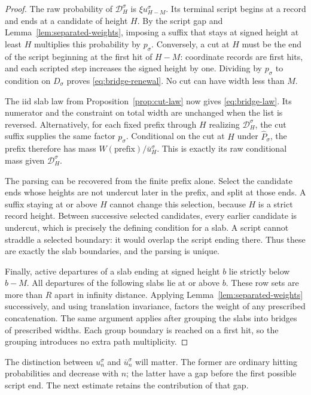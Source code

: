 \begin{proof}
The raw probability of $\mathcal D_H^\sigma$ is
$\xi u_{H-M}^\sigma$. Its terminal script begins at a record and ends at
a candidate of height $H$. By the script gap and
Lemma~\ref{lem:separated-weights}, imposing a suffix that stays at signed
height at least $H$ multiplies this probability by $p_\sigma$.
Conversely, a cut at $H$ must be the end of the script beginning at the
first hit of $H-M$: coordinate records are first hits, and each scripted
step increases the signed height by one. Dividing by $p_\sigma$ to
condition on $D_\sigma$ proves \eqref{eq:bridge-renewal}. No cut can have
width less than $M$.

The iid slab law from Proposition~\ref{prop:cut-law} now gives
\eqref{eq:bridge-law}. Its numerator and the constraint on total width are
unchanged when the list is reversed. Alternatively, for each fixed prefix
through $H$ realizing $\mathcal D_H^\sigma$, the cut suffix supplies the
same factor $p_\sigma$. Conditional on the cut at $H$ under
$\widehat P_\sigma$, the prefix therefore has mass
$W(\text{prefix})/\bar u_H^\sigma$. This is exactly its raw conditional
mass given $\mathcal D_H^\sigma$.

The parsing can be recovered from the finite prefix alone. Select the
candidate ends whose heights are not undercut later in the prefix, and
split at those ends. A suffix staying at or above $H$ cannot change this
selection, because $H$ is a strict record height. Between successive
selected candidates, every earlier candidate is undercut, which is
precisely the defining condition for a slab. A script cannot straddle a
selected boundary: it would overlap the script ending there. Thus these
are exactly the slab boundaries, and the parsing is unique.

Finally, active departures of a slab ending at signed height $b$ lie
strictly below $b-M$. All departures of the following slabs lie at or
above $b$. These row sets are more than $R$ apart in infinity distance.
Applying Lemma~\ref{lem:separated-weights} successively, and using
translation invariance, factors the weight of any prescribed
concatenation. The same argument applies after grouping the slabs into
bridges of prescribed widths. Each group boundary is reached on a first
hit, so the grouping introduces no extra path multiplicity.
\end{proof}

The distinction between $u_n^\sigma$ and $\bar u_n^\sigma$ will matter.
The former are ordinary hitting probabilities and decrease with $n$;
the latter have a gap before the first possible script end. The next
estimate retains the contribution of that gap.

